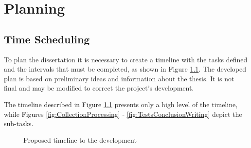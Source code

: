 
%



\chapter{Planning}
\label{cha:Planning}

\section{Time Scheduling}

    To plan the dissertation it is necessary to create a timeline with the tasks defined and the intervals that must be completed, as shown in Figure \ref{fig:TimelineScheduling}. The developed plan is based on preliminary ideas and information about the thesis. It is not final and may be modified to correct the project's development.

    The timeline described in Figure \ref{fig:TimelineScheduling} presents only a high level of the timeline, while Figures \ref{fig:CollectionProcessing} - \ref{fig:TestsConclusionWriting} depict the sub-tasks.

    \begin{figure}[htbp]
        \centering
        \fboxsep=0pt\fboxrule=0.5pt
        \caption{Proposed timeline to the development}
        \label{fig:TimelineScheduling}
    \end{figure}

